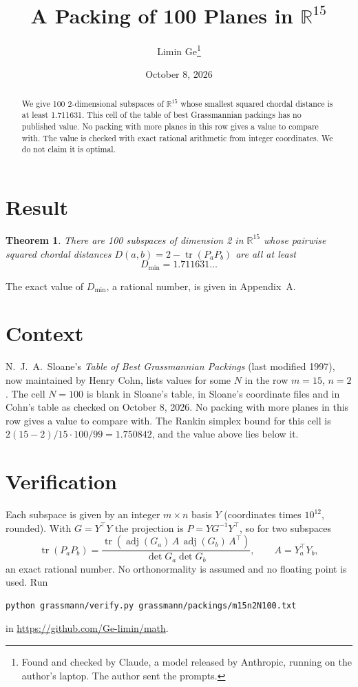 \documentclass[11pt,a4paper]{article}
\title{A Packing of 100 Planes in $\mathbb{R}^{15}$}
\author{Limin Ge\thanks{Found and checked by Claude, a model released by Anthropic, running on the author's laptop. The author sent the prompts.}}
\date{October 8, 2026}
\newtheorem*{theorem}{Theorem}
\begin{document}
\maketitle
\begin{abstract}
We give 100 2-dimensional subspaces of $\mathbb{R}^{15}$ whose smallest squared chordal distance is at least 1.711631. This cell of the table of best Grassmannian packings has no published value. No packing with more planes in this row gives a value to compare with. The value is checked with exact rational arithmetic from integer coordinates. We do not claim it is optimal.
\end{abstract}

\section{Result}
\begin{theorem}
There are 100 subspaces of dimension 2 in $\mathbb{R}^{15}$ whose pairwise squared chordal distances $D(a,b) = 2 - \operatorname{tr}(P_aP_b)$ are all at least
\[ D_{\min} = 1.711631\ldots \]
\end{theorem}
The exact value of $D_{\min}$, a rational number, is given in Appendix~A.


\section{Context}
N.~J.~A.~Sloane's \emph{Table of Best Grassmannian Packings} (last modified 1997), now maintained by Henry Cohn, lists values for some $N$ in the row $m=15$, $n=2$. The cell $N=100$ is blank in Sloane's table, in Sloane's coordinate files and in Cohn's table as checked on October 8, 2026. No packing with more planes in this row gives a value to compare with. The Rankin simplex bound for this cell is $2(15-2)/15\cdot 100/99 = 1.750842$, and the value above lies below it.


\section{Verification}
Each subspace is given by an integer $m\times n$ basis $Y$ (coordinates times $10^{12}$, rounded). With $G=Y^\top Y$ the projection is $P=YG^{-1}Y^\top$, so for two subspaces
\[ \operatorname{tr}(P_aP_b)=\frac{\operatorname{tr}(\operatorname{adj}(G_a)\,A\,\operatorname{adj}(G_b)\,A^\top)}{\det G_a\det G_b},\qquad A=Y_a^\top Y_b, \]
an exact rational number. No orthonormality is assumed and no floating point is used. Run
\begin{verbatim}
python grassmann/verify.py grassmann/packings/m15n2N100.txt
\end{verbatim}
in \url{https://github.com/Ge-limin/math}.
\end{document}
